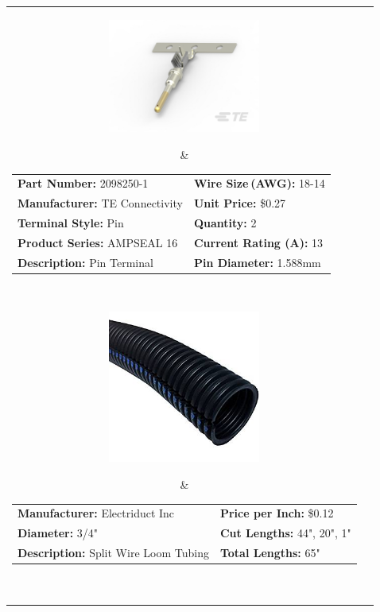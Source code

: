 \documentclass[12pt,letterpaper]{article}
\begin{document}
\begin{longtable}{c l}
\parbox[c]{5cm}{\includegraphics[width=5cm]{2098250-1.png} }
& \begin{tabular}{l l}
\textbf{Part Number:} 2098250-1 & \textbf{Wire Size (AWG):} 18-14 \\
\textbf{Manufacturer:} TE Connectivity & \textbf{Unit Price:} \$0.27 \\
\textbf{Terminal Style:} Pin & \textbf{Quantity:} 2 \\
\textbf{Product Series:} AMPSEAL 16 & \textbf{Current Rating (A):} 13 \\
\textbf{Description:} Pin Terminal  & \textbf{Pin Diameter:} 1.588\si{\milli\meter} \\
\end{tabular} \\

\parbox[c]{5cm}{\includegraphics[width=5cm]{3by8loomtubing.jpeg} }
& \begin{tabular}{l l}
\textbf{Manufacturer:} Electriduct Inc & \textbf{Price per Inch:} \$0.12 \\
\textbf{Diameter:} 3/4" & \textbf{Cut Lengths:} 44", 20", 1" \\
\textbf{Description:} Split Wire Loom Tubing & \textbf{Total Lengths:} 65" \\
\end{tabular} \\


\end{longtable}
\end{document}
